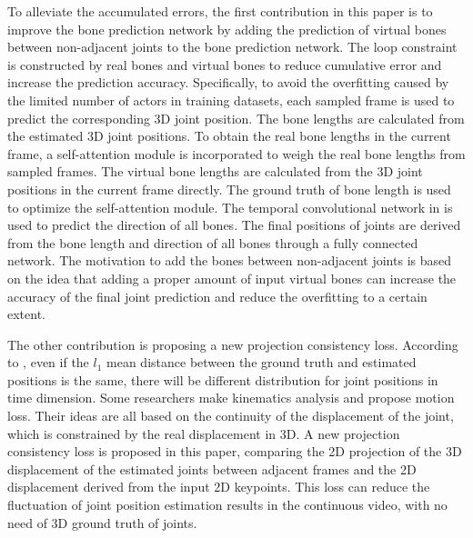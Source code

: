 \documentclass[journal]{IEEEtran}
\begin{document}
To alleviate the accumulated errors, the first contribution in this paper is to improve the bone prediction network by adding the prediction of virtual bones between non-adjacent joints to the bone prediction network. The loop constraint is constructed by real bones and virtual bones to reduce cumulative error and increase the prediction accuracy. Specifically, to avoid the overfitting caused by the limited number of actors in training datasets, each sampled frame is used to predict the corresponding 3D joint position. The bone lengths are calculated from the estimated 3D joint positions. To obtain the real bone lengths in the current frame, a self-attention module is incorporated to weigh the real bone lengths from sampled frames. The virtual bone lengths are calculated from the 3D joint positions in the current frame directly. The ground truth of bone length is used to optimize the self-attention module. The temporal convolutional network in \cite{20183D} is used to predict the direction of all bones. The final positions of joints are derived from the bone length and direction of all bones through a fully connected network. The motivation to add the bones between non-adjacent joints is based on the idea that adding a proper amount of input virtual bones can increase the accuracy of the final joint prediction and reduce the overfitting to a certain extent.



The other contribution is proposing a new projection consistency loss. According to  \cite{wang2020motion}, even if the $l_1$ mean distance between the ground truth and estimated positions is the same, there will be different distribution for joint positions in time dimension. Some researchers \cite{2020Deep,wang2020motion} make kinematics analysis and propose motion loss. Their ideas are all based on the continuity of the displacement of the joint, which is constrained by the real displacement in 3D. A new projection consistency loss is proposed in this paper, comparing the 2D projection of the 3D displacement of the estimated joints between adjacent frames and the 2D displacement derived from the input 2D keypoints. This loss can reduce the fluctuation of joint position estimation results in the continuous video, with no need of 3D ground truth of joints.
\end{document}
